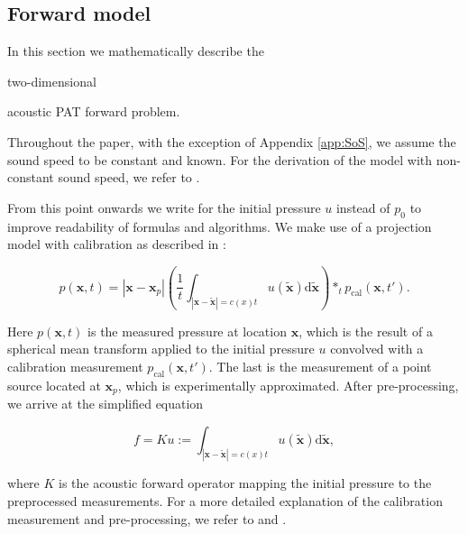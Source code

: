 \documentclass[journal]{IEEEtran}
\newcommand{\hl}[1]{\cbcolor{red}\begin{changebar}{#1}\end{changebar}}
\begin{document}
\subsection{Forward model}\label{sec:fw_model}
In this section we mathematically describe the \hl{two-dimensional} acoustic PAT forward problem. \hl{Throughout the paper, with the exception of Appendix \ref{app:SoS}, we assume the sound speed to be constant and known. For the derivation of the model with non-constant sound speed, we refer to \cite[section 5.3]{Willemink2010}.} From this point onwards we write for the initial pressure $u$ instead of $p_0$ to improve readability of formulas and algorithms. We make use of a projection model with calibration as described in \cite{Wang2004}:
\hl{\begin{equation}\label{eq:FW_full}
p(\mathbf{x},t) = |\mathbf{x}-\mathbf{x}_p|\left(\frac{1}{t}\int_{|\mathbf{x}-\tilde{\mathbf{x}}|=c(x)t} u(\tilde{\mathbf{x}})\text{d} \tilde{\mathbf{x}}\right)\ast_t p_\text{cal}\left(\mathbf{x},t'\right).
\end{equation}}
Here $p(\mathbf{x},t)$ is the measured pressure at location $\mathbf{x}$, which is the result of a spherical mean transform \cite{Kruger1995} applied to the initial pressure $u$ convolved with a calibration measurement $p_\text{cal}\left(\mathbf{x},t'\right)$. The last is the measurement of a point source located at $\mathbf{x}_p$, which is experimentally approximated. After pre-processing, we arrive at the simplified equation 
\hl{\begin{equation}\label{eq:FW_prep}
f = Ku:=\int_{|\mathbf{x}-\tilde{\mathbf{x}}|=c(x)t} u(\tilde{\mathbf{x}})\text{d} \tilde{\mathbf{x}},
\end{equation}}
where $K$ is the acoustic forward operator mapping the initial pressure to the preprocessed measurements. For a more detailed explanation of the calibration measurement and pre-processing, we refer to \cite[Chapter 2]{Willemink2010} and \cite{Boink2018}.
\end{document}
